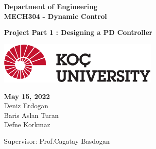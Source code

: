\begin{titlepage}
	\begin{center}
		\vspace*{1cm}
        \hline
        \vspace{0.4cm}
		\textbf{\Large Department of Engineering  \\MECH304 - Dynamic Control\\}
		\vspace{0.4cm}
		\hline

		\vspace{2cm}
		\textbf{\Huge{Project Part 1 : Designing a PD Controller\\}}
		\vspace{0.1cm}
		\vspace{4cm}
		
		
        \includegraphics[width=0.6\textwidth]{images/koclogo.png}
        
        
        \vfill
        \Large \textbf{May 15, 2022} \\
        \Large{Deniz Erdogan \\
        Baris Aslan Turan \\
        Defne Korkmaz}
        
        \vspace{1cm}
        \large{Supervisor: Prof.Cagatay Basdogan}
        


		\vspace{0.8cm}


	\end{center}
\end{titlepage}